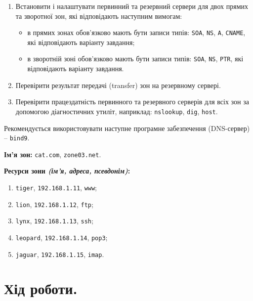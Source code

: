 \documentclass[14pt, a4paper]{extreport}
\begin{document}
	\begin{enumerate}
		\item Встановити і налаштувати первинний та резервний сервери для двох прямих та зворотної зон, які відповідають наступним вимогам:
		
		\begin{itemize}
			\item в прямих зонах обов'язково мають бути записи типів: \texttt{SOA}, \texttt{NS}, \texttt{A}, \texttt{CNAME}, які відповідають варіанту завдання;
			
			\item в зворотній зоні обов'язково мають бути записи типів: \texttt{SOA}, \texttt{NS}, \texttt{PTR}, які відповідають варіанту завдання.
		\end{itemize}
		
		\item Перевірити результат передачі (transfer) зон на резервному сервері.
		
		\item Перевірити працездатність первинного та резервного серверів для всіх зон за допомогою діагностичних утиліт, наприклад: \texttt{nslookup}, \texttt{dig}, \texttt{host}.
	\end{enumerate}
	
	Рекомендується використовувати наступне програмне забезпечення (DNS-сервер) -- \texttt{bind9}.
	
	\textbf{Ім'я зон:} \texttt{cat.com}, \texttt{zone03.net}.
	
	\textbf{Ресурси зони \textit{(ім'я, адреса, псевдонім)}:}
	
	\begin{enumerate}
		\item \texttt{tiger}, \texttt{192.168.1.11}, \texttt{www};
		
		\item \texttt{lion}, \texttt{192.168.1.12}, \texttt{ftp};
		
		\item \texttt{lynx}, \texttt{192.168.1.13}, \texttt{ssh};
		
		\item \texttt{leopard}, \texttt{192.168.1.14}, \texttt{pop3};
		
		\item \texttt{jaguar}, \texttt{192.168.1.15}, \texttt{imap}.
	\end{enumerate}
	
	\section*{Хід роботи.}
	
\end{document}
